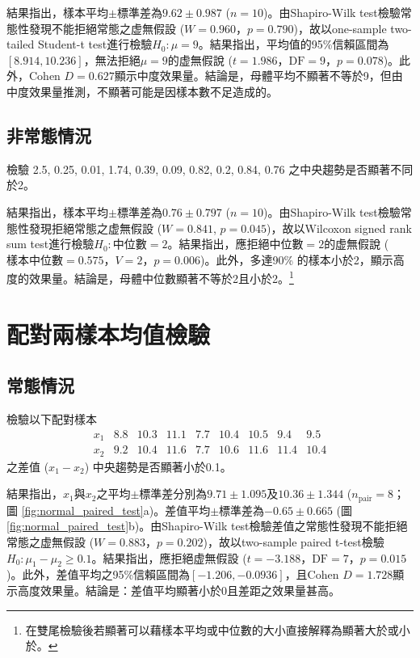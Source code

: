 \documentclass[12pt]{article}
\begin{document}
結果指出，樣本平均$\pm$標準差為$9.62 \pm 0.987$ ($n = 10$)。由Shapiro-Wilk test檢驗常態性發現不能拒絕常態之虚無假設 ($W = 0.960$，$p = 0.790$)，故以one-sample two-tailed Student-t test進行檢驗$H_0: \mu=9$。結果指出，平均值的95\%信賴區間為$\left[8.914, 10.236\right]$，無法拒絕$\mu = 9$的虚無假說 ($t = 1.986$，$\text{DF} = 9$，$p = 0.078$)。此外，Cohen $D = 0.627$顯示中度效果量。結論是，母體平均不顯著不等於9，但由中度效果量推測，不顯著可能是因樣本數不足造成的。

\subsection{非常態情況}
檢驗 2.5, 0.25, 0.01, 1.74, 0.39, 0.09, 0.82, 0.2, 0.84, 0.76 之中央趨勢是否顯著不同於2。

結果指出，樣本平均$\pm$標準差為$0.76 \pm 0.797$ ($n = 10$)。由Shapiro-Wilk test檢驗常態性發現拒絕常態之虚無假設 ($W = 0.841$, $p = 0.045$)，故以Wilcoxon signed rank sum test進行檢驗$H_0: \text{中位數}=2$。結果指出，應拒絕中位數$=2$的虚無假說 ($\text{樣本中位數}=0.575$，$V = 2$，$p = 0.006$)。此外，多達90\% 的樣本小於2，顯示高度的效果量。結論是，母體中位數顯著不等於2且小於2。\footnote{在雙尾檢驗後若顯著可以藉樣本平均或中位數的大小直接解釋為顯著大於或小於。}

\section{配對兩樣本均值檢驗}
\subsection{常態情況}
檢驗以下配對樣本
\[
\begin{matrix}
x_1 & 8.8 & 10.3 & 11.1 & 7.7 &10.4 & 10.5 & 9.4 & 9.5 \\
x_2 & 9.2 & 10.4 & 11.6 & 7.7 & 10.6 & 11.6 & 11.4 & 10.4
\end{matrix}
\]
之差值 ($x_1 - x_2$) 中央趨勢是否顯著小於0.1。

結果指出，$x_1$與$x_2$之平均$\pm$標準差分別為$9.71 \pm 1.095$及$10.36 \pm 1.344$ ($n_\mathrm{pair} = 8$； 圖 \ref{fig:normal_paired_test}a)。差值平均$\pm$標準差為$-0.65\pm0.665$  (圖 \ref{fig:normal_paired_test}b)。由Shapiro-Wilk test檢驗差值之常態性發現不能拒絕常態之虚無假設 ($W = 0.883$，$p = 0.202$)，故以two-sample paired t-test檢驗$H_0: \mu_1 - \mu_2 \geq 0.1$。結果指出，應拒絕虚無假設 ($t = -3.188$，$\text{DF} = 7$，$p = 0.015$)。此外，差值平均之95\%信賴區間為$\left[-1.206, -0.0936\right]$，且Cohen $D = 1.728$顯示高度效果量。結論是：差值平均顯著小於0且差距之效果量甚高。
\end{document}
